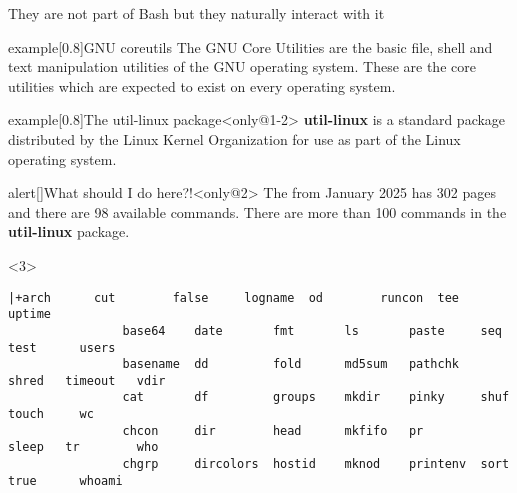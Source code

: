 
\begin{frame}[fragile]{They are not part of Bash but they naturally interact with it}
    \vspace{-2mm}
    \begin{varblock}{example}[0.8\textwidth]{GNU coreutils}
        The GNU Core Utilities are the basic file, shell and text manipulation utilities of the GNU operating system.
        These are the core utilities which are expected to exist on every operating system.
    \end{varblock}
    \begin{overlayarea}{\textwidth}{0.6\textheight}
        \begin{varblock}{example}[0.8\textwidth]{The util-linux package}<only@1-2>
            \textbf{util-linux} is a standard package distributed by the Linux Kernel Organization for use as part of the Linux operating system.
        \end{varblock}
        \PrepareURLsymbol[PB]
        \begin{varblock}{alert}[\textwidth]{What should I do here?!}<only@2>
            The  from January 2025 has \alert{302 pages} and there are \alert{98 available commands}.
            There are more than \alert{100 commands} in the \textbf{util-linux} package.
        \end{varblock}
        \begin{onlyenv}<3>
            \begin{lstlisting}[style=myBash, style=smaller, numbers=none, aboveskip=3mm]
                |+arch      cut        false     logname  od        runcon  tee       uptime
                base64    date       fmt       ls       paste     seq     test      users
                basename  dd         fold      md5sum   pathchk   shred   timeout   vdir
                cat       df         groups    mkdir    pinky     shuf    touch     wc
                chcon     dir        head      mkfifo   pr        sleep   tr        who
                chgrp     dircolors  hostid    mknod    printenv  sort    true      whoami

\end{lstlisting}
\end{onlyenv}
\end{overlayarea}
\end{frame}
